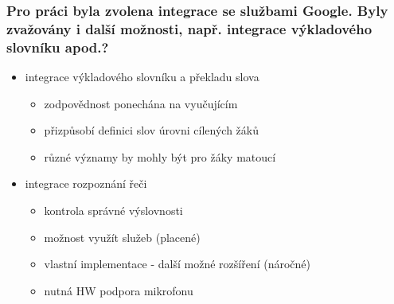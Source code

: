 \begin{frame}[noframenumbering]
\begin{center}
    \frametitle{Pro práci byla zvolena integrace se službami Google. Byly zvažovány i další možnosti, např. integrace výkladového slovníku apod.?}

    \begin{itemize}
        \item integrace výkladového slovníku a překladu slova
        \begin{itemize}
            \item zodpovědnost ponechána na vyučujícím
            \item přizpůsobí definici slov úrovni cílených žáků
            \item různé významy by mohly být pro žáky matoucí
        \end{itemize}
        \item integrace rozpoznání řeči
        \begin{itemize}
            \item kontrola správné výslovnosti
            \item možnost využít služeb (placené)
            \item vlastní implementace - další možné rozšíření (náročné)
            \item nutná HW podpora mikrofonu
        \end{itemize}
    \end{itemize}

\end{center}
\end{frame}


